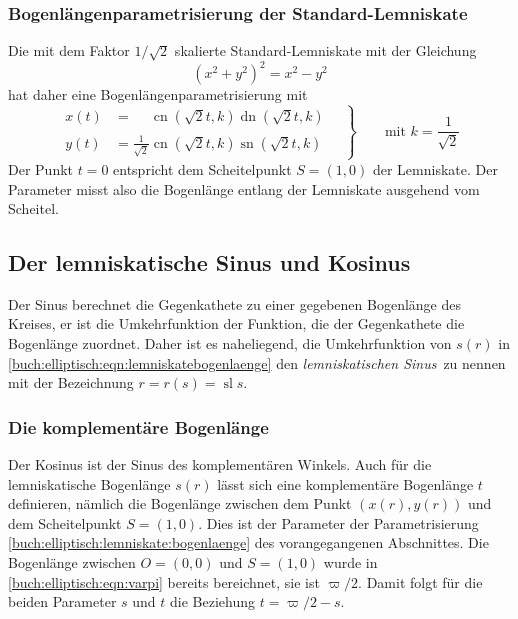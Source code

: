 \subsubsection{Bogenlängenparametrisierung der Standard-Lemniskate}
Die mit dem Faktor $1/\sqrt{2}$ skalierte Standard-Lemniskate mit der
Gleichung
\[
(x^2+y^2)^2 = x^2-y^2
\]
hat daher eine Bogenlängenparametrisierung mit
\begin{equation}
\left.
\begin{aligned}
x(t)
&=
\phantom{\frac{1}{\sqrt{2}}}
\operatorname{cn}(\sqrt{2}t,k)\operatorname{dn}(\sqrt{2}t,k)
\\
y(t)
&=
\frac{1}{\sqrt{2}}
\operatorname{cn}(\sqrt{2}t,k)\operatorname{sn}(\sqrt{2}t,k)
\end{aligned}
\quad
\right\}
\qquad
\text{mit $\displaystyle k=\frac{1}{\sqrt{2}}$}
\label{buch:elliptisch:lemniskate:bogenlaenge}
\end{equation}
Der Punkt $t=0$ entspricht dem Scheitelpunkt $S=(1,0)$ der Lemniskate.
Der Parameter misst also die Bogenlänge entlang der Lemniskate ausgehend
vom Scheitel.

%
%
\subsection{Der lemniskatische Sinus und Kosinus}
Der Sinus berechnet die Gegenkathete zu einer gegebenen Bogenlänge des
Kreises, er ist die Umkehrfunktion der Funktion, die der Gegenkathete
die Bogenlänge zuordnet.
Daher ist es naheliegend, die Umkehrfunktion von $s(r)$ in 
\eqref{buch:elliptisch:eqn:lemniskatebogenlaenge}
den {\em lemniskatischen Sinus} zu nennen mit der Bezeichnung
%
%
$r=r(s)=\operatorname{sl} s$.

%
%
\subsubsection{Die komplementäre Bogenlänge}
Der Kosinus ist der Sinus des komplementären Winkels.
Auch für die lemniskatische Bogenlänge $s(r)$ lässt sich eine
komplementäre Bogenlänge $t$ definieren, nämlich die Bogenlänge
zwischen dem Punkt $(x(r), y(r))$ und dem Scheitelpunkt $S=(1,0)$.
Dies ist der Parameter der Parametrisierung
\eqref{buch:elliptisch:lemniskate:bogenlaenge}
des vorangegangenen Abschnittes.
Die Bogenlänge zwischen $O=(0,0)$ und $S=(1,0)$ wurde in
\eqref{buch:elliptisch:eqn:varpi} bereits bereichnet,
sie ist $\varpi/2$.
Damit folgt für die beiden Parameter $s$ und $t$ die Beziehung
$t = \varpi/2 - s$.


